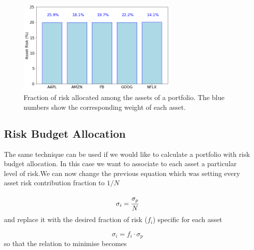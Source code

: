 \begin{figure}[htb]
\centering
\includegraphics[width=0.7\textwidth]{figures/risk_parity}
\caption{Fraction of risk allocated among the assets of a portfolio. The blue numbers show the corresponding weight of each asset.}
\label{fig:risk_parity}
\end{figure}

\subsection{Risk Budget Allocation}
\label{risk-budget-allocation}

The same technique can be used if we would like to calculate a portfolio with risk budget allocation. In this case we want to associate to each asset a particular level of risk.We can now change the previous equation which was setting every asset risk contribution fraction to $1/N$

\begin{equation} 
\sigma _{i}=\cfrac{\sigma_p}{N} 
\end{equation}
and replace it with the desired fraction of risk (\(f_i\)) specific for each asset

\begin{equation} 
\sigma _{i}=f_i \cdot \sigma_p 
\end{equation}
so that the relation to minimise becomes

